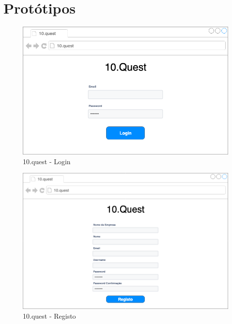 \chapter{Protótipos}
\label{a:prototipos}

\begin{figure}[ht!]
	\begin{center}
		\includegraphics[width=1\textwidth]{img/prototipos/1.png}
		\caption{10.quest - Login}
		\label{10q-login}
	\end{center}
\end{figure}

\begin{figure}[ht!]
	\begin{center}
		\includegraphics[width=1\textwidth]{img/prototipos/2.png}
		\caption{10.quest - Registo}
		\label{10q-registo}
	\end{center}
\end{figure}

